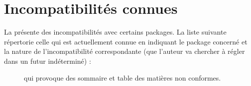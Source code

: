 \chapter{Incompatibilités connues}
\label{cha:incomp-conn}

La \yatcl{} présente des incompatibilités avec certains packages.  La liste
suivante répertorie %
celle qui est actuellement connue %
en indiquant
le package concerné %
et la nature de l'incompatibilité correspondante (que l'auteur va chercher
à régler dans un futur indéterminé) :
\begin{description}
\item[] qui provoque des sommaire et table des matières non
  conformes.
\end{description}
